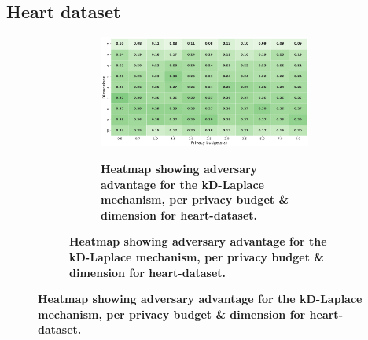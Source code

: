 \subsection{Heart dataset}
\begin{figure}[H]
    \centering
    \begin{subfigure}[b]{0.85\textwidth}
        \begin{subfigure}[c]{1\textwidth}
            \caption{\textbf{Heatmap showing adversary advantage for the kD-Laplace mechanism, per privacy budget \& dimension for heart-dataset.}}
            \includegraphics[width=1\textwidth]{Results/kd-laplace/kd-Laplace/heart-dataset/shokri_mi_adv.png}
            \label{fig:privacy_heart-dataset_adversial_advantage_kd-laplace}
        \end{subfigure}
        \vfill %


\end{subfigure}
\end{figure}
